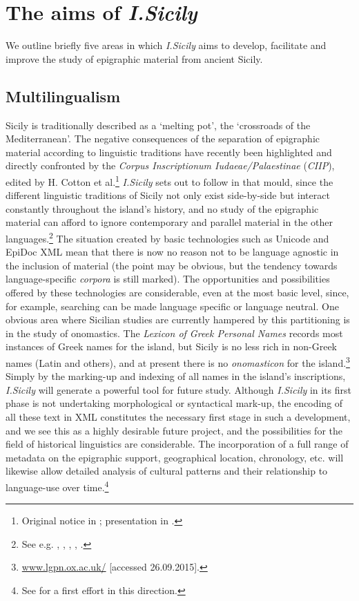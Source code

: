 \documentclass[amsthm,ebook]{saparticle}
\begin{document}
\section{The aims of \emph{I.Sicily}}
\noindent We outline briefly five areas in which \emph{I.Sicily} aims to develop, facilitate and improve the study of epigraphic material
from ancient Sicily.




\subsection{Multilingualism}


\noindent Sicily is traditionally described as a `melting pot', the `crossroads of the Mediterranean'. The negative consequences
of the separation of epigraphic material according to linguistic traditions have recently been highlighted and directly
confronted by the \emph{Corpus Inscriptionum Iudaeae/Palaestinae} (\emph{CIIP}), edited by H. Cotton et al.\footnote{ Original notice
in \citet{cotton_corpus_1999}; presentation in \citet{Cotton:2007aa}.} \emph{I.Sicily} sets out to follow in that mould, since the
different linguistic traditions of Sicily not only exist side-by-side but interact constantly throughout the island’s
history, and no study of the epigraphic material can afford to ignore contemporary and parallel material in the other
languages.\footnote{ See e.g. \citet{manganaro_greco_1993}, \citet{prag_epigraphy_2002}, \citet{salmeri_i_2004}, \citet{korhonen_language_2011}, \citet{tribulato_language_2012}.} The situation
created by basic technologies such as Unicode and EpiDoc XML mean that there is now no reason not to be language
agnostic in the inclusion of material (the point may be obvious, but the tendency towards language-specific \emph{corpora} is
still marked). The opportunities and possibilities offered by these technologies are considerable, even at the most
basic level, since, for example, searching can be made language specific or language neutral. One obvious area where
Sicilian studies are currently hampered by this partitioning is in the study of onomastics. The \emph{Lexicon of Greek
Personal Names} records most instances of Greek names for the island, but Sicily is no less rich in non-Greek names
(Latin and others), and at present there is no \emph{onomasticon} for the island.\footnote{ \url{www.lgpn.ox.ac.uk/} [accessed
26.09.2015].} Simply by the marking-up and indexing of all names in the island’s inscriptions, \emph{I.Sicily} will generate a
powerful tool for future study. Although \emph{I.Sicily} in its first phase is not undertaking morphological or syntactical
mark-up, the encoding of all these text in XML constitutes the necessary first stage in such a development, and we see
this as a highly desirable future project, and the possibilities for the field of historical linguistics are
considerable. The incorporation of a full range of metadata on the epigraphic support, geographical location,
chronology, etc. will likewise allow detailed analysis of cultural patterns and their relationship to language-use over
time.\footnote{ See \citet{prag_epigraphy_2002} for a first effort in this direction.}
\end{document}
